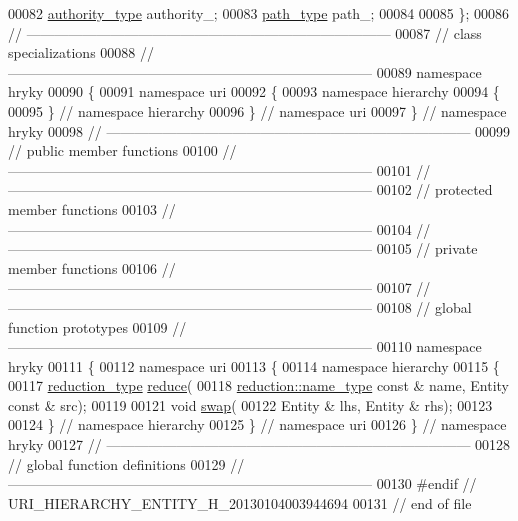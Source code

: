\begin{DoxyCode}
00082     \hyperlink{classhryky_1_1uri_1_1authority_1_1_entity}{authority_type} authority\_;
00083     \hyperlink{classhryky_1_1uri_1_1path_1_1_entity}{path_type} path\_;
00084 
00085 \};
00086 \textcolor{comment}{//
      ------------------------------------------------------------------------------}
00087 \textcolor{comment}{// class specializations}
00088 \textcolor{comment}{//
      ------------------------------------------------------------------------------}
00089 \textcolor{keyword}{namespace }hryky
00090 \{
00091 \textcolor{keyword}{namespace }uri
00092 \{
00093 \textcolor{keyword}{namespace }hierarchy
00094 \{
00095 \} \textcolor{comment}{// namespace hierarchy}
00096 \} \textcolor{comment}{// namespace uri}
00097 \} \textcolor{comment}{// namespace hryky}
00098 \textcolor{comment}{//
      ------------------------------------------------------------------------------}
00099 \textcolor{comment}{// public member functions}
00100 \textcolor{comment}{//
      ------------------------------------------------------------------------------}
00101 \textcolor{comment}{//
      ------------------------------------------------------------------------------}
00102 \textcolor{comment}{// protected member functions}
00103 \textcolor{comment}{//
      ------------------------------------------------------------------------------}
00104 \textcolor{comment}{//
      ------------------------------------------------------------------------------}
00105 \textcolor{comment}{// private member functions}
00106 \textcolor{comment}{//
      ------------------------------------------------------------------------------}
00107 \textcolor{comment}{//
      ------------------------------------------------------------------------------}
00108 \textcolor{comment}{// global function prototypes}
00109 \textcolor{comment}{//
      ------------------------------------------------------------------------------}
00110 \textcolor{keyword}{namespace }hryky
00111 \{
00112 \textcolor{keyword}{namespace }uri
00113 \{
00114 \textcolor{keyword}{namespace }hierarchy
00115 \{
00117     \hyperlink{namespacehryky_a343a9a4c36a586be5c2693156200eadc}{reduction_type} \hyperlink{namespacehryky_1_1uri_ab4530b241565d82fb0768bb29031858f}{reduce}(
00118         \hyperlink{namespacehryky_1_1reduction_ac686c30a4c8d196bbd0f05629a6b921f}{reduction::name_type} \textcolor{keyword}{const} & name, Entity \textcolor{keyword}{const} & src);
00119 
00121     \textcolor{keywordtype}{void} \hyperlink{namespacehryky_1_1uri_a385681623309ce37d502b7efea1bf924}{swap}(
00122         Entity & lhs, Entity & rhs);
00123 
00124 \} \textcolor{comment}{// namespace hierarchy}
00125 \} \textcolor{comment}{// namespace uri}
00126 \} \textcolor{comment}{// namespace hryky}
00127 \textcolor{comment}{//
      ------------------------------------------------------------------------------}
00128 \textcolor{comment}{// global function definitions}
00129 \textcolor{comment}{//
      ------------------------------------------------------------------------------}
00130 \textcolor{preprocessor}{#endif // URI\_HIERARCHY\_ENTITY\_H\_20130104003944694}
00131 \textcolor{preprocessor}{}\textcolor{comment}{// end of file}
\end{DoxyCode}
